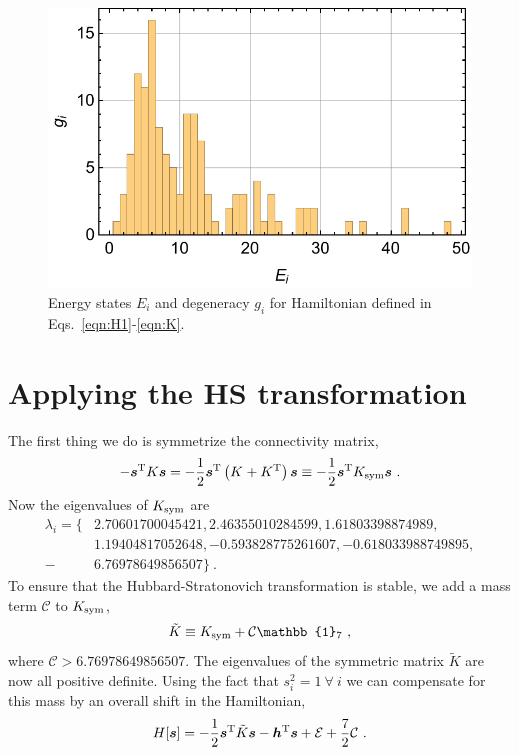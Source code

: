 \documentclass[11pt]{article}
\begin{document}
\begin{figure}
\center
\includegraphics[width=.8\columnwidth]{figures/histogram.pdf}
\caption{Energy states $E_i$ and degeneracy $g_i$ for Hamiltonian defined in Eqs.~\eqref{eqn:H1}-\eqref{eqn:K}.\label{fig:histogram}}
\end{figure}


\section{Applying the HS transformation}
The first thing we do is symmetrize the connectivity matrix, 
\begin{equation}
-\bm s^{\rm T}K\bm s =-\frac{1}{2}\bm s^{\rm T}\left(K^{}+K^{\rm T}\right)\bm s\equiv-\frac{1}{2}\bm s^{\rm T}K_{\rm sym}\bm s\ .
\end{equation}
Now the eigenvalues of $K_{\rm sym}$ are
\begin{align*}
\lambda_i = \{&2.70601700045421, 2.46355010284599, 1.61803398874989, \\
&1.19404817052648, -0.593828775261607, -0.618033988749895,\\ 
-&6.76978649856507\}\ .
\end{align*}
To ensure that the Hubbard-Stratonovich transformation is stable, we add a mass term $\mathcal{C}$ to $K_{\rm sym}$,
\begin{equation}
\tilde K \equiv K_{\rm sym}+\mathcal{C}\mathbb{1}_7\ ,
\end{equation}
where $\mathcal{C}> 6.76978649856507$.  The eigenvalues of the symmetric matrix $\tilde K$ are now all positive definite.  Using the fact that $s_i^2=1\ \forall\  i$ we can compensate for this mass by an overall shift in the Hamiltonian,
\begin{equation}
H[\bm s]=-\frac{1}{2}\bm s^{\rm T}\tilde K\bm s-\bm h^{\rm T}\bm s+\mathcal{E}+\frac{7}{2}\mathcal{C}\ .
\end{equation}
\end{document}
